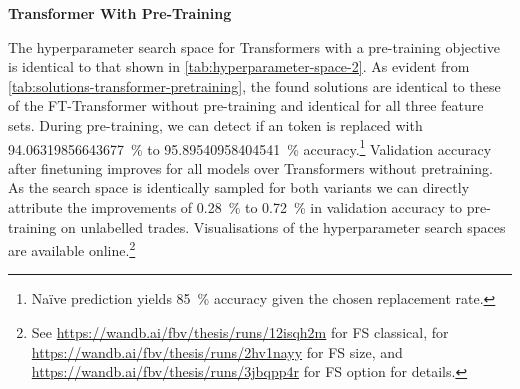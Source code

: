 \textbf{Transformer With Pre-Training}

The hyperparameter search space for Transformers with a pre-training objective is identical to that shown in \cref{tab:hyperparameter-space-2}. As evident from \cref{tab:solutions-transformer-pretraining}, the found solutions are identical to these of the FT-Transformer without pre-training and identical for all three feature sets. During pre-training, we can detect if an token is replaced with \SI{94.06319856643677}{\percent} to \SI{95.89540958404541}{\percent} accuracy.\footnote{Na\"ive prediction yields \SI{85}{\percent} accuracy given the chosen replacement rate.} Validation accuracy after finetuning improves for all models over Transformers without pretraining. As the search space is identically sampled for both variants we can directly attribute the improvements of \SI{0.28}{\percent} to \SI{0.72}{\percent} in validation accuracy to pre-training on unlabelled trades.  Visualisations of the hyperparameter search spaces are available online.\footnote{See \url{https://wandb.ai/fbv/thesis/runs/12isqh2m} for \gls{FS} classical, for \url{https://wandb.ai/fbv/thesis/runs/2hv1nayy} for \gls{FS} size, and \url{https://wandb.ai/fbv/thesis/runs/3jbqpp4r} for \gls{FS} option for details.}


